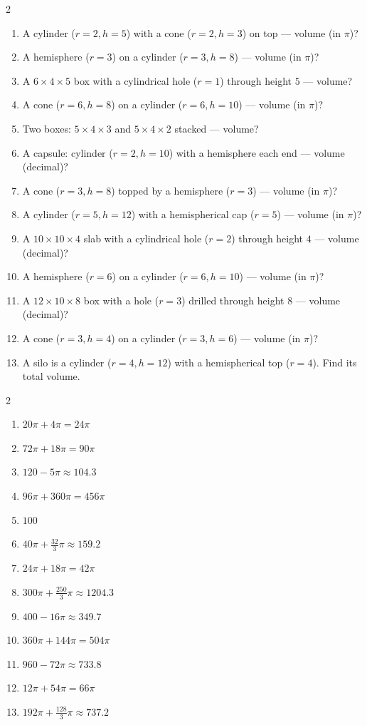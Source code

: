 \documentclass[11pt]{article}
\begin{document}
\begin{recapbox}
\begin{multicols}{2}
\small
\begin{enumerate}[leftmargin=*,itemsep=3pt]
  \item A cylinder ($r=2,h=5$) with a cone ($r=2,h=3$) on top — volume (in $\pi$)?
  \item A hemisphere ($r=3$) on a cylinder ($r=3,h=8$) — volume (in $\pi$)?
  \item A $6\times4\times5$ box with a cylindrical hole ($r=1$) through height $5$ — volume?
  \item A cone ($r=6,h=8$) on a cylinder ($r=6,h=10$) — volume (in $\pi$)?
  \item Two boxes: $5\times4\times3$ and $5\times4\times2$ stacked — volume?
  \item A capsule: cylinder ($r=2,h=10$) with a hemisphere each end — volume (decimal)?
  \item A cone ($r=3,h=8$) topped by a hemisphere ($r=3$) — volume (in $\pi$)?
  \item A cylinder ($r=5,h=12$) with a hemispherical cap ($r=5$) — volume (in $\pi$)?
  \item A $10\times10\times4$ slab with a cylindrical hole ($r=2$) through height $4$ — volume (decimal)?
  \item A hemisphere ($r=6$) on a cylinder ($r=6,h=10$) — volume (in $\pi$)?
  \item A $12\times10\times8$ box with a hole ($r=3$) drilled through height $8$ — volume (decimal)?
  \item A cone ($r=3,h=4$) on a cylinder ($r=3,h=6$) — volume (in $\pi$)?
  \item A silo is a cylinder ($r=4,h=12$) with a hemispherical top ($r=4$). Find its total volume.
\end{enumerate}
\end{multicols}
\end{recapbox}

\begin{keybox}
\begin{multicols}{2}
\small
\begin{enumerate}[leftmargin=*,itemsep=3pt]
  \item $20\pi+4\pi=24\pi$
  \item $72\pi+18\pi=90\pi$
  \item $120-5\pi\approx104.3$
  \item $96\pi+360\pi=456\pi$
  \item $100$
  \item $40\pi+\tfrac{32}{3}\pi\approx159.2$
  \item $24\pi+18\pi=42\pi$
  \item $300\pi+\tfrac{250}{3}\pi\approx1204.3$
  \item $400-16\pi\approx349.7$
  \item $360\pi+144\pi=504\pi$
  \item $960-72\pi\approx733.8$
  \item $12\pi+54\pi=66\pi$
  \item $192\pi+\tfrac{128}{3}\pi\approx737.2$
\end{enumerate}
\end{multicols}
\end{keybox}
\end{document}
